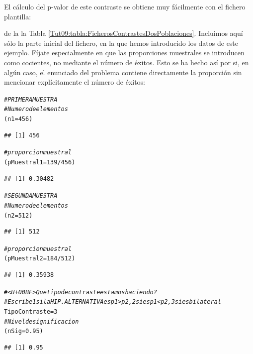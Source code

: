\documentclass[10pt,a4paper]{article}\usepackage[]{graphicx}\usepackage[]{color}
\makeatletter
\newcommand{\hlnum}[1]{\textcolor[rgb]{0.686,0.059,0.569}{#1}}%
\newcommand{\hlcom}[1]{\textcolor[rgb]{0.678,0.584,0.686}{\textit{#1}}}%
\newcommand{\hlopt}[1]{\textcolor[rgb]{0,0,0}{#1}}%
\newcommand{\hlstd}[1]{\textcolor[rgb]{0.345,0.345,0.345}{#1}}%
\newcommand{\hlkwb}[1]{\textcolor[rgb]{0.69,0.353,0.396}{#1}}%
\newenvironment{kframe}{%
 \def\at@end@of@kframe{}%
 \ifinner\ifhmode%
  \def\at@end@of@kframe{\end{minipage}}%
  \begin{minipage}{\columnwidth}%
 \fi\fi%
 \def\FrameCommand##1{\hskip\@totalleftmargin \hskip-\fboxsep
 \colorbox{shadecolor}{##1}\hskip-\fboxsep
     \hskip-\linewidth \hskip-\@totalleftmargin \hskip\columnwidth}%
 \MakeFramed {\advance\hsize-\width
   \@totalleftmargin\z@ \linewidth\hsize
   \@setminipage}}%
 {\par\unskip\endMakeFramed%
 \at@end@of@kframe}
\newenvironment{knitrout}{}{} %
\newcounter {cont01}
\makeatother
\begin{document}
El cálculo del p-valor de este contraste se obtiene muy fácilmente con el fichero plantilla:
\begin{center}
\end{center}
de la la Tabla \ref{Tut09:tabla:FicherosContrastesDosPoblaciones}. Incluimos aquí sólo la parte inicial del fichero, en la que hemos introducido los datos de este ejemplo. Fíjate especialmente en que las proporciones muestrales se introducen como cocientes, no mediante el número de éxitos. Esto se ha hecho así por si, en algún caso, el enunciado del problema contiene directamente la proporción sin mencionar explícitamente el número de éxitos:

\begin{knitrout}
\color{fgcolor}\begin{kframe}
\begin{alltt}
\hlcom{# PRIMERA MUESTRA}
\hlcom{# Numero de elementos}
\hlstd{(n1} \hlkwb{=} \hlnum{456}\hlstd{)}
\end{alltt}
\begin{verbatim}
## [1] 456
\end{verbatim}
\begin{alltt}
\hlcom{# proporcion muestral}
\hlstd{(pMuestral1} \hlkwb{=} \hlnum{139}\hlopt{/}\hlnum{456}\hlstd{)}
\end{alltt}
\begin{verbatim}
## [1] 0.30482
\end{verbatim}
\begin{alltt}
\hlcom{# SEGUNDA MUESTRA}
\hlcom{# Numero de elementos}
\hlstd{(n2} \hlkwb{=}  \hlnum{512}\hlstd{)}
\end{alltt}
\begin{verbatim}
## [1] 512
\end{verbatim}
\begin{alltt}
\hlcom{# proporcion muestral}
\hlstd{(pMuestral2} \hlkwb{=} \hlnum{184}\hlopt{/}\hlnum{512}\hlstd{)}
\end{alltt}
\begin{verbatim}
## [1] 0.35938
\end{verbatim}
\begin{alltt}
\hlcom{# <U+00BF>Que tipo de contraste estamos haciendo?}
\hlcom{# Escribe 1 si la HIP. ALTERNATIVA es p1 > p2, 2 si es p1 < p2, 3 si es bilateral}
\hlstd{TipoContraste} \hlkwb{=} \hlnum{3}
  \hlcom{#Nivel de significacion}
  \hlstd{(nSig} \hlkwb{=} \hlnum{0.95}\hlstd{)}
\end{alltt}
\begin{verbatim}
## [1] 0.95
\end{verbatim}
\end{kframe}
\end{knitrout}
\end{document}

